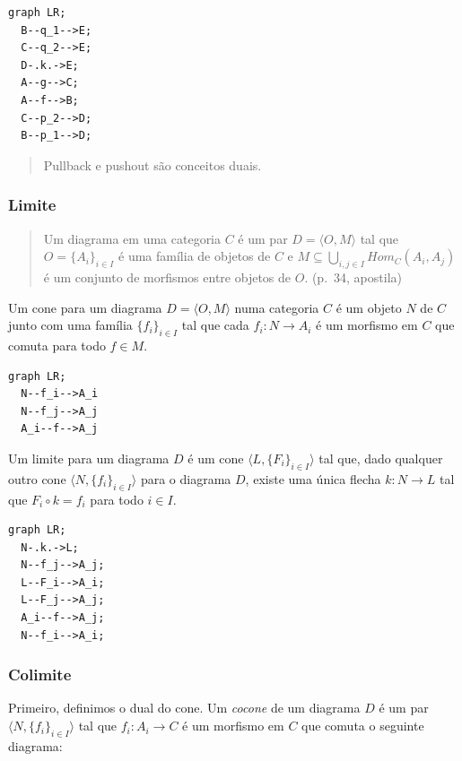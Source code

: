\begin{verbatim}
graph LR;
  B--q_1-->E;
  C--q_2-->E;
  D-.k.->E;
  A--g-->C;
  A--f-->B;
  C--p_2-->D;
  B--p_1-->D;
\end{verbatim}

\begin{quote}
Pullback e pushout são conceitos duais.
\end{quote}

\hypertarget{limite}{%
\subsubsection{Limite}\label{limite}}

\begin{quote}
Um diagrama em uma categoria \(C\) é um par \(D = \langle O, M \rangle\)
tal que \(O = \{A_i\}_{i \in I}\) é uma família de objetos de \(C\) e
\(M \subseteq \bigcup_{i,j \in I} Hom_C(A_i, A_j)\) é um conjunto de
morfismos entre objetos de \(O\). (p.~34, apostila)
\end{quote}

Um cone para um diagrama \(D = \langle O, M\rangle\) numa categoria
\(C\) é um objeto \(N\) de \(C\) junto com uma família
\(\{ f_i \}_{i \in I}\) tal que cada \(f_i : N \rightarrow A_i\) é um
morfismo em \(C\) que comuta para todo \(f \in M\).

\begin{verbatim}
graph LR;
  N--f_i-->A_i
  N--f_j-->A_j
  A_i--f-->A_j
\end{verbatim}

Um limite para um diagrama \(D\) é um cone
\(\langle L, \{ F_i \}_{i \in I} \rangle\) tal que, dado qualquer outro
cone \(\langle N, \{ f_i \}_{i \in I} \rangle\) para o diagrama \(D\),
existe uma única flecha \(k : N \rightarrow L\) tal que
\(F_i \circ k = f_i\) para todo \(i \in I\).

\begin{verbatim}
graph LR;
  N-.k.->L;
  N--f_j-->A_j;
  L--F_i-->A_i;
  L--F_j-->A_j;
  A_i--f-->A_j;
  N--f_i-->A_i;
\end{verbatim}

\hypertarget{colimite}{%
\subsubsection{Colimite}\label{colimite}}

Primeiro, definimos o dual do cone. Um \emph{cocone} de um diagrama
\(D\) é um par \(\langle N, \{ f_i \}_{i \in I} \rangle\) tal que
\(f_i : A_i \rightarrow C\) é um morfismo em \(C\) que comuta o seguinte
diagrama:

